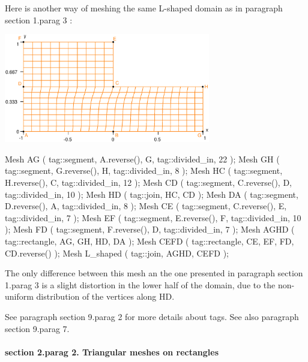 Here is another way of meshing the same L-shaped domain as in paragraph
\numb section 1.\numb parag 3 :

{ 
\centerline{\includegraphics[width=90mm]{L-shaped-distorted.eps}} }

\verbatim
   Mesh AG ( tag::segment, A.reverse(), G, tag::divided_in, 22 );
   Mesh GH ( tag::segment, G.reverse(), H, tag::divided_in, 8 );
   Mesh HC ( tag::segment, H.reverse(), C, tag::divided_in, 12 );
   Mesh CD ( tag::segment, C.reverse(), D, tag::divided_in, 10 );
   Mesh HD ( tag::join, HC, CD );
   Mesh DA ( tag::segment, D.reverse(), A, tag::divided_in, 8 );
   Mesh CE ( tag::segment, C.reverse(), E, tag::divided_in, 7 );
   Mesh EF ( tag::segment, E.reverse(), F, tag::divided_in, 10 );
   Mesh FD ( tag::segment, F.reverse(), D, tag::divided_in, 7 );
   Mesh AGHD ( tag::rectangle, AG, GH, HD, DA );
   Mesh CEFD ( tag::rectangle, CE, EF, FD, CD.reverse() );
   Mesh L_shaped ( tag::join, AGHD, CEFD );
\endverbatim

The only difference between this mesh an the one presented in paragraph \numb section 1.\numb parag 3
is a slight distortion in the lower half of the domain,
due to the non-uniform distribution of the vertices along {\codett HD}.

See paragraph \numb section 9.\numb parag 2 for more details about tags.
See also paragraph \numb section 9.\numb parag 7.


\vfil\eject
\paragraph{\numb section 2.\numb parag 2. Triangular meshes on rectangles}

